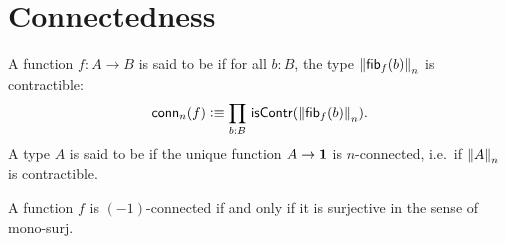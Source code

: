 \documentclass[hott-all.tex]{subfiles}
\begin{document}
\section{Connectedness}
% 
% 
\begin{defn}
A function $f:A\to B$ is said to be 
%
%
if for all $b:B$, the type $\trunc n{\hfiber f b}$ is contractible:
\begin{equation*}
  \mathsf{conn}_n(f)\defeq \prd{b:B}\iscontr(\trunc n{\hfiber{f}b}).
\end{equation*}
A type $A$ is said to be 
%
%
 if the unique function $A\to\unit$ is $n$-connected, i.e.\ if $\trunc nA$ is contractible.
\end{defn}
% 
% 
\begin{lem}
  A function $f$ is $(-1)$-connected if and only if it is surjective in the sense of mono-surj.%
\end{lem}
% 
% 
\end{document}

